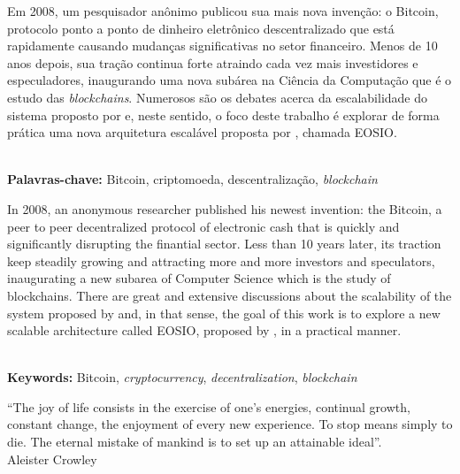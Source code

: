 \documentclass[a4paper,12pt]{monografia}
\theoremstyle{plain}
\theoremstyle{definition}
\theoremstyle{remark}
\begin{document}



Em 2008, um pesquisador an\^onimo publicou sua mais nova inven\c{c}\~ao: o Bitcoin, protocolo ponto a ponto de dinheiro eletr\^onico descentralizado que est\'a rapidamente causando mudan\c{c}as significativas no setor financeiro.
Menos de 10 anos depois, sua tra\c{c}\~ao continua forte atraindo cada vez mais investidores e especuladores, inaugurando uma nova sub\'area na Ci\^encia da Computa\c{c}\~ao que \'e o estudo das \textit{blockchains}.
Numerosos s\~{a}o os debates acerca da escalabilidade do sistema proposto por  e, neste sentido, o foco deste trabalho \'e explorar de forma pr\'atica uma nova arquitetura escal\'{a}vel proposta por , chamada EOSIO.

\noindent \\ \textbf{Palavras-chave:} Bitcoin, criptomoeda, descentraliza\c{c}\~ao, \textit{blockchain}

In 2008, an anonymous researcher published his newest invention: the Bitcoin, a peer to peer decentralized protocol of electronic cash that is quickly and significantly disrupting the finantial sector.
Less than 10 years later, its traction keep steadily growing and attracting more and more investors and speculators, inaugurating a new subarea of Computer Science which is the study of blockchains.
There are great and extensive discussions about the scalability of the system proposed by  and, in that sense, the goal of this work is to explore a new scalable architecture called EOSIO, proposed by , in a practical manner.

\noindent \\ \textbf{Keywords:} Bitcoin, \textit{cryptocurrency}, \textit{decentralization}, \textit{blockchain}


\newpage

\begin{epigrafe}
``The joy of life consists in the exercise of one’s energies, continual growth, constant change, the enjoyment of every new experience. To stop means simply to die. The eternal mistake of mankind is to set up an attainable ideal''.\\
\hfill Aleister Crowley
\end{epigrafe}
\end{document}
